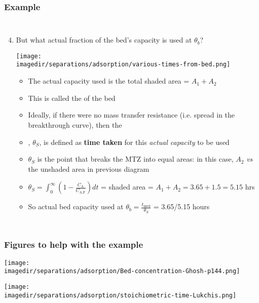 \begin{frame}\frametitle{Example}
	\vspace{-12pt}
	\begin{columns}[t]
		\begin{enumerate}
			\setcounter{enumi}{3}
			\item	But what actual fraction of the bed's capacity is used at $\theta_b$?
				\begin{center}
					\texttt{[image: \\imagedir/separations/adsorption/various-times-from-bed.png]}
				\end{center}
				\vspace{-12pt}
				\begin{itemize}
					\item	The actual capacity used is the total shaded area = $A_1 + A_2$
					\item	This is called the {\color{purple}{stoichiometric capacity}} of the bed
					\item	Ideally, if there were no mass transfer resistance (i.e. spread in the breakthrough curve), then the
					\item	{\color{purple}{stoichiometric time}}, $\theta_S$, is defined as \textbf{time taken} for this \emph{actual capacity} to be used
					\item	$\theta_S$ is the point that breaks the MTZ into equal areas: in this case, $A_2$ \emph{vs} the unshaded area in previous diagram
					\vspace{2pt}
					\item	{\scriptsize $\theta_S = \displaystyle \int_0^{\infty}{\left(1-\frac{C_\text{A}}{C_\text{A,F}} \right)dt}$ = shaded area = $A_1 + A_2 = 3.65 + 1.5 = 5.15$ hrs}
					\item	So actual bed capacity used at $\theta_b = \displaystyle\frac{t_\text{used}}{\theta_S}$ = 3.65/5.15 hours {\color{myOrange}{$\sim71\%$}}
				\end{itemize}
		\end{enumerate}
	\end{columns}
\end{frame}

\begin{frame}\frametitle{Figures to help with the example}
	\begin{center}
		\texttt{[image: \\imagedir/separations/adsorption/Bed-concentration-Ghosh-p144.png]}
	\end{center}
	\begin{center}
		\texttt{[image: \\imagedir/separations/adsorption/stoichiometric-time-Lukchis.png]}
	\end{center}
\end{frame}

